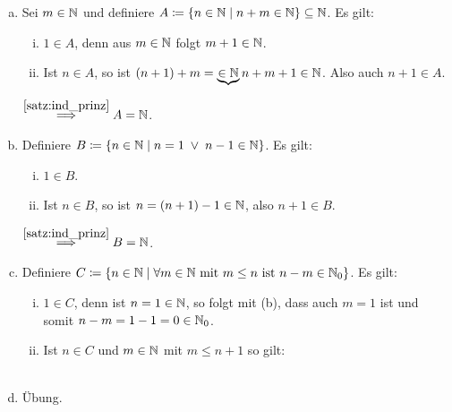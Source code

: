 \documentclass[../ana1.tex]{subfiles}
\begin{document}
\begin{bew}\leavevmode
	\begin{enumerate}[(a)]
		\item Sei \(m \in \mathbb{N} \) und definiere \(A \coloneqq \{n \in \mathbb{N}  \; \vert  \; n + m \in \mathbb{N}\} \subseteq \mathbb{N} \). Es gilt:
			  \begin{enumerate}[(i)]
				\item \(1 \in A \), denn aus \(m \in \mathbb{N} \) folgt \(m + 1 \in \mathbb{N} \).
				\item Ist \(n \in A \), so ist \((n + 1) + m = \underbrace{\in \mathbb{N}}{n + m} + 1 \in \mathbb{N} \).
					  Also auch \(n + 1 \in A \).
			  \end{enumerate}
			  \(\overset{\autoref{satz:ind_prinz}}{\implies} A = \N \).
		\item Definiere \(B \coloneqq \{n \in \mathbb{N}  \; \vert  \; n = 1  \; \vee  \; n - 1 \in \mathbb{N}\} \). Es gilt:
			  \begin{enumerate}[(i)]
				\item \(1 \in B \).
				\item Ist \(n \in B \), so ist \(n = (n + 1) - 1 \in \mathbb{N} \), also \(n + 1 \in B \).
			  \end{enumerate}
			  \(\overset{\autoref{satz:ind_prinz}}{\implies} B = \N \).
		\item Definiere \(C \coloneqq \{n \in \mathbb{N}  \; \vert  \; \forall m \in \mathbb{N} \text{ mit } m \leq n \text{ ist } n - m \in \mathbb{N}_{0}\} \). Es gilt:
			  \begin{enumerate}[(i)]
				\item \(1 \in C \), denn ist \(n = 1 \in \mathbb{N} \), so folgt mit (b), dass auch \(m = 1 \) ist und somit
					  \(n - m = 1 - 1 = 0 \in \mathbb{N}_{0} \).
				\item Ist \(n \in C \) und \(m \in \mathbb{N} \) mit \(m \leq n + 1 \) so gilt: \\
					   \\
			  \end{enumerate}
		\item Übung.\qedhere
	\end{enumerate}
\end{bew}
\end{document}
